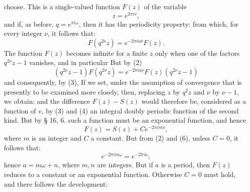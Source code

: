 choose. This is a single-valued function $F(z)$ of the variable
\[
z = e^{2\pi iv},
\]
and if, as before, $q = e^{\pi i\omega}$, then it has the periodicity property:
from which, for every integer $\nu$, it follows that:
\[
F(q^{2\nu}z) = e^{-2\pi ia\nu}F(z).
\]
The function $F(z)$ becomes infinite for a finite $z$ only
when one of the factors $q^{2\nu}z - 1$ vanishes, and in
particular
But by (2)
\[
(q^{2\nu}z - 1)F(q^{2\nu}z) = e^{-2\pi ia\nu}F(z)(q^{2\nu}z - 1)
\]
and consequently, by (3),
If we set, under the assumption of convergence that is presently
 to be examined more closely,
then, replacing $z$ by $q^2z$ and $\nu$ by $\nu - 1$, we obtain:
and the difference $F(z) - S(z)$ would therefore be, considered as a function of $v$,
by (3) and (4) an integral doubly periodic function
 of the second kind. But by § 16, 6. such a function must be an exponential
 function, and hence
\[
F(z) = S(z) + Ce^{-2\pi imv},
\]
where $m$ is an integer and $C$ a constant. But from (2) and
(6), unless $C = 0$, it follows that:
\[
e^{-2\pi im\omega} = e^{-2\pi ia};
\]
hence $a = m\omega + n$, where $m, n$ are integers. But if $a$
is a period, then $F(z)$ reduces to a constant or an
exponential function. Otherwise $C = 0$ must hold, and there follows
the development:
